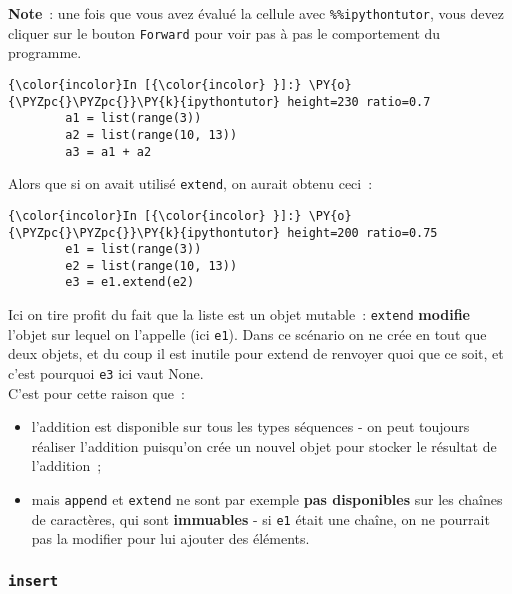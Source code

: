     \textbf{Note}~: une fois que vous avez évalué la cellule avec
\texttt{\%\%ipythontutor}, vous devez cliquer sur le bouton
\texttt{Forward} pour voir pas à pas le comportement du programme.

    \begin{Verbatim}[commandchars=\\\{\}]
{\color{incolor}In [{\color{incolor} }]:} \PY{o}{\PYZpc{}\PYZpc{}}\PY{k}{ipythontutor} height=230 ratio=0.7
        a1 = list(range(3))
        a2 = list(range(10, 13))
        a3 = a1 + a2
\end{Verbatim}


    Alors que si on avait utilisé \texttt{extend}, on aurait obtenu ceci~:

    \begin{Verbatim}[commandchars=\\\{\}]
{\color{incolor}In [{\color{incolor} }]:} \PY{o}{\PYZpc{}\PYZpc{}}\PY{k}{ipythontutor} height=200 ratio=0.75
        e1 = list(range(3))
        e2 = list(range(10, 13))
        e3 = e1.extend(e2)
\end{Verbatim}


    Ici on tire profit du fait que la liste est un objet mutable~:
\texttt{extend} \textbf{modifie} l'objet sur lequel on l'appelle (ici
\texttt{e1}). Dans ce scénario on ne crée en tout que deux objets, et du
coup il est inutile pour extend de renvoyer quoi que ce soit, et c'est
pourquoi \texttt{e3} ici vaut None.\\

    C'est pour cette raison que~:

\begin{itemize}
\tightlist
\item
  l'addition est disponible sur tous les types séquences - on peut
  toujours réaliser l'addition puisqu'on crée un nouvel objet pour
  stocker le résultat de l'addition~;
\item
  mais \texttt{append} et \texttt{extend} ne sont par exemple
  \textbf{pas disponibles} sur les chaînes de caractères, qui sont
  \textbf{immuables} - si \texttt{e1} était une chaîne, on ne pourrait
  pas la modifier pour lui ajouter des éléments.
\end{itemize}

    \hypertarget{insert}{%
\subsubsection{\texorpdfstring{\texttt{insert}}{insert}}\label{insert}}

